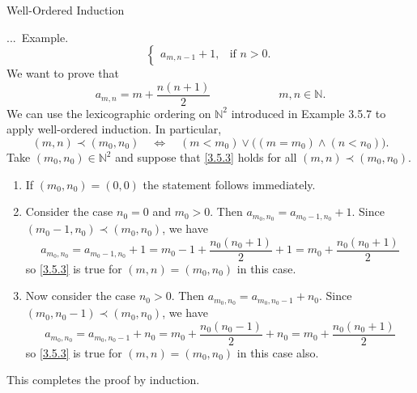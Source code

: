 \documentclass[smaller,hyperref={CJKbookmarks=true}]{beamer}
\newcommand{\N}{\mathbb{N}} \newcommand{\Z}{\mathbb{Z}} \newcommand{\Q}{\mathbb{Q}}
\newcounter{zhuo}[subsection]
\renewcommand{\thezhuo}{\thesection.\thesubsection.\arabic{zhuo}}
\newenvironment{EXAMPLE}{\stepcounter{zhuo}\alert{\!\thezhuo.~Example.\,}}{}
\begin{document}
\begin{frame}{Well-Ordered Induction}
\begin{spacing}{1}
\begin{EXAMPLE}
\[\begin{cases}
             a_{m,n-1}+1, & \mbox{if }n>0.
           \end{cases}\]
We want to prove that
\begin{equation}\label{3.5.3}
a_{m,n}=m+\frac{n(n+1)}{2}\qquad\qquad\qquad
m,n\in\N.
\end{equation}
We can use the lexicographic ordering on $\N^2$ introduced in Example 3.5.7 to apply well-ordered induction. In particular,
\[(m,n)\prec(m_0,n_0)\quad\Leftrightarrow\quad
(m<m_0)\vee\big((m=m_0)\wedge(n<n_0)\big).\]
Take $(m_0,n_0)\in\N^2$ and suppose that \eqref{3.5.3} holds for all $(m,n)\prec(m_0,n_0)$.
\end{EXAMPLE}
\newpage
\begin{enumerate}[1.]
  \item If $(m_0,n_0)=(0,0)$ the statement follows immediately.
  \item Consider the case $n_0=0$ and $m_0>0$. Then $a_{m_0,n_0}=a_{m_0-1,n_0}+1$. Since $(m_0-1,n_0)\prec(m_0,n_0)$, we have
      \[a_{m_0,n_0}=a_{m_0-1,n_0}+1=m_0-1+\frac{n_0(n_0+1)}{2}+1=m_0+\frac{n_0(n_0+1)}{2}\]
      so \eqref{3.5.3} is true for $(m,n)=(m_0,n_0)$ in this case.
  \item Now consider the case $n_0>0$. Then $a_{m_0,n_0}=a_{m_0,n_0-1}+n_0$. Since $(m_0,n_0-1)\prec(m_0,n_0)$, we have
      \[a_{m_0,n_0}=a_{m_0,n_0-1}+n_0=m_0+\frac{n_0(n_0-1)}{2}+n_0=m_0+\frac{n_0(n_0+1)}{2}\]
      so \eqref{3.5.3} is true for $(m,n)=(m_0,n_0)$ in this case also.
\end{enumerate}
This completes the proof by induction.
\end{spacing}
\end{frame}
\end{document}
